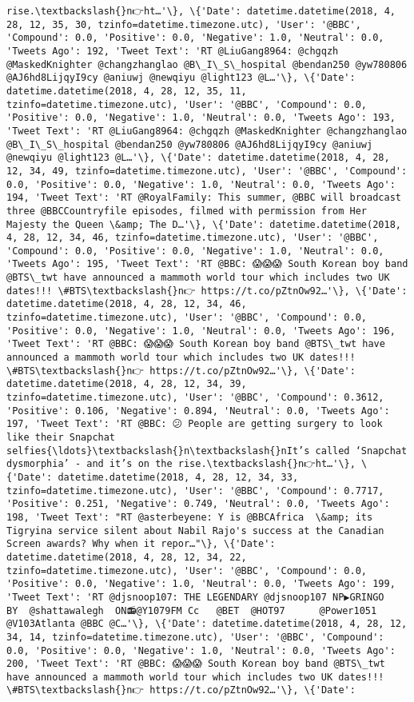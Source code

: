 \documentclass[11pt]{article}
\begin{document}
\begin{Verbatim}[commandchars=\\\{\}]
rise.\textbackslash{}n👉ht…'\}, \{'Date': datetime.datetime(2018, 4, 28, 12, 35, 30, tzinfo=datetime.timezone.utc), 'User': '@BBC', 'Compound': 0.0, 'Positive': 0.0, 'Negative': 1.0, 'Neutral': 0.0, 'Tweets Ago': 192, 'Tweet Text': 'RT @LiuGang8964: @chgqzh @MaskedKnighter @changzhanglao @B\_I\_S\_hospital @bendan250 @yw780806 @AJ6hd8LijqyI9cy @aniuwj @newqiyu @light123 @L…'\}, \{'Date': datetime.datetime(2018, 4, 28, 12, 35, 11, tzinfo=datetime.timezone.utc), 'User': '@BBC', 'Compound': 0.0, 'Positive': 0.0, 'Negative': 1.0, 'Neutral': 0.0, 'Tweets Ago': 193, 'Tweet Text': 'RT @LiuGang8964: @chgqzh @MaskedKnighter @changzhanglao @B\_I\_S\_hospital @bendan250 @yw780806 @AJ6hd8LijqyI9cy @aniuwj @newqiyu @light123 @L…'\}, \{'Date': datetime.datetime(2018, 4, 28, 12, 34, 49, tzinfo=datetime.timezone.utc), 'User': '@BBC', 'Compound': 0.0, 'Positive': 0.0, 'Negative': 1.0, 'Neutral': 0.0, 'Tweets Ago': 194, 'Tweet Text': 'RT @RoyalFamily: This summer, @BBC will broadcast three @BBCCountryfile episodes, filmed with permission from Her Majesty the Queen \&amp; The D…'\}, \{'Date': datetime.datetime(2018, 4, 28, 12, 34, 46, tzinfo=datetime.timezone.utc), 'User': '@BBC', 'Compound': 0.0, 'Positive': 0.0, 'Negative': 1.0, 'Neutral': 0.0, 'Tweets Ago': 195, 'Tweet Text': 'RT @BBC: 😱😱😱 South Korean boy band @BTS\_twt have announced a mammoth world tour which includes two UK dates!!! \#BTS\textbackslash{}n👉 https://t.co/pZtnOw92…'\}, \{'Date': datetime.datetime(2018, 4, 28, 12, 34, 46, tzinfo=datetime.timezone.utc), 'User': '@BBC', 'Compound': 0.0, 'Positive': 0.0, 'Negative': 1.0, 'Neutral': 0.0, 'Tweets Ago': 196, 'Tweet Text': 'RT @BBC: 😱😱😱 South Korean boy band @BTS\_twt have announced a mammoth world tour which includes two UK dates!!! \#BTS\textbackslash{}n👉 https://t.co/pZtnOw92…'\}, \{'Date': datetime.datetime(2018, 4, 28, 12, 34, 39, tzinfo=datetime.timezone.utc), 'User': '@BBC', 'Compound': 0.3612, 'Positive': 0.106, 'Negative': 0.894, 'Neutral': 0.0, 'Tweets Ago': 197, 'Tweet Text': 'RT @BBC: 😕 People are getting surgery to look like their Snapchat selfies{\ldots}\textbackslash{}n\textbackslash{}nIt’s called ‘Snapchat dysmorphia’ - and it’s on the rise.\textbackslash{}n👉ht…'\}, \{'Date': datetime.datetime(2018, 4, 28, 12, 34, 33, tzinfo=datetime.timezone.utc), 'User': '@BBC', 'Compound': 0.7717, 'Positive': 0.251, 'Negative': 0.749, 'Neutral': 0.0, 'Tweets Ago': 198, 'Tweet Text': "RT @asterbeyene: Y is @BBCAfrica  \&amp; its Tigryina service silent about Nabil Rajo's success at the Canadian Screen awards? Why when it repor…"\}, \{'Date': datetime.datetime(2018, 4, 28, 12, 34, 22, tzinfo=datetime.timezone.utc), 'User': '@BBC', 'Compound': 0.0, 'Positive': 0.0, 'Negative': 1.0, 'Neutral': 0.0, 'Tweets Ago': 199, 'Tweet Text': 'RT @djsnoop107: THE LEGENDARY @djsnoop107 NP▶GRINGO   BY  @shattawalegh  ON📻@Y1079FM Cc   @BET  @HOT97      @Power1051 @V103Atlanta @BBC @C…'\}, \{'Date': datetime.datetime(2018, 4, 28, 12, 34, 14, tzinfo=datetime.timezone.utc), 'User': '@BBC', 'Compound': 0.0, 'Positive': 0.0, 'Negative': 1.0, 'Neutral': 0.0, 'Tweets Ago': 200, 'Tweet Text': 'RT @BBC: 😱😱😱 South Korean boy band @BTS\_twt have announced a mammoth world tour which includes two UK dates!!! \#BTS\textbackslash{}n👉 https://t.co/pZtnOw92…'\}, \{'Date': 
\end{Verbatim}
\end{document}
